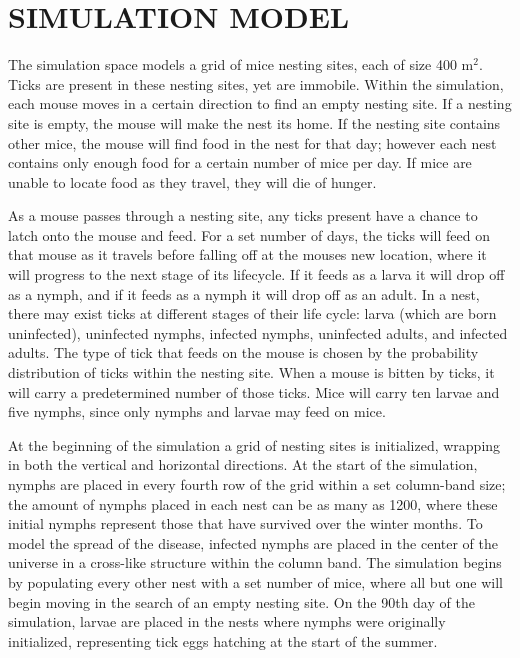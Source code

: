 \documentclass[letterpaper, 10 pt, conference]{ieeeconf}  %
\begin{document}
\section{SIMULATION MODEL}
The simulation space models a grid of mice nesting sites, each of size 400 m$^2$. Ticks are present in these nesting sites, yet are immobile. Within the simulation, each mouse moves in a certain direction to find an empty nesting site. If a nesting site is empty, the mouse will make the nest its home. If the nesting site contains other mice, the mouse will find food in the nest for that day; however each nest contains only enough food for a certain number of mice per day. If mice are unable to locate food as they travel, they will die of hunger. 

As a mouse passes through a nesting site, any ticks present have a chance to latch onto the mouse and feed. For a set number of days, the ticks will feed on that mouse as it travels before falling off at the mouse\textquotesingle  s new location, where it will progress to the next stage of its lifecycle. If it feeds as a larva it will drop off as a nymph, and if it feeds as a nymph it will drop off as an adult.  In a nest, there may exist ticks at different stages of their life cycle: larva (which are born uninfected), uninfected nymphs, infected nymphs, uninfected adults, and infected adults. The type of tick that feeds on the mouse is chosen by the probability distribution of ticks within the nesting site. When a mouse is bitten by ticks, it will carry a predetermined number of those ticks. Mice will carry ten larvae and five nymphs, since only nymphs and larvae may feed on mice. 

At the beginning of the simulation a grid of nesting sites is initialized, wrapping in both the vertical and horizontal directions. At the start of the simulation, nymphs are placed in every fourth row of the grid within a set column-band size; the amount of nymphs placed in each nest can be as many as 1200, where these initial nymphs represent those that have survived over the winter months. To model the spread of the disease, infected nymphs are placed in the center of the universe in a cross-like structure within the column band. The simulation begins by populating every other nest with a set number of mice, where all but one will begin moving in the search of an empty nesting site. On the 90th day of the simulation, larvae are placed in the nests where nymphs were originally initialized, representing tick eggs hatching at the start of the summer.   
\end{document}
